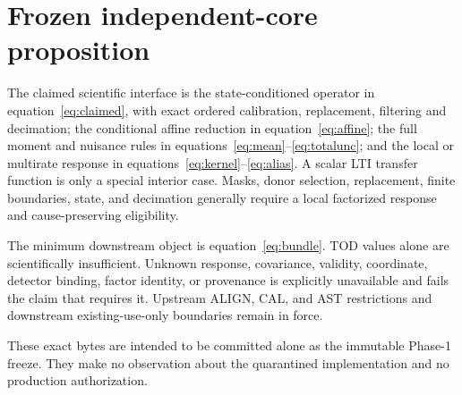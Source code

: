 \documentclass[11pt]{article}
\begin{document}
\section{Frozen independent-core proposition}

The claimed scientific interface is the state-conditioned operator in
equation~\eqref{eq:claimed}, with exact ordered calibration, replacement,
filtering and decimation; the conditional affine reduction in
equation~\eqref{eq:affine}; the full moment and nuisance rules in
equations~\eqref{eq:mean}--\eqref{eq:totalunc}; and the local or multirate
response in equations~\eqref{eq:kernel}--\eqref{eq:alias}.  A scalar LTI
transfer function is only a special interior case.  Masks, donor selection,
replacement, finite boundaries, state, and decimation generally require a
local factorized response and cause-preserving eligibility.

The minimum downstream object is equation~\eqref{eq:bundle}.  TOD values alone
are scientifically insufficient.  Unknown response, covariance, validity,
coordinate, detector binding, factor identity, or provenance is explicitly
unavailable and fails the claim that requires it.  Upstream ALIGN, CAL, and
AST restrictions and downstream existing-use-only boundaries remain in force.

These exact bytes are intended to be committed alone as the immutable Phase-1
freeze.  They make no observation about the quarantined implementation and no
production authorization.
\end{document}
